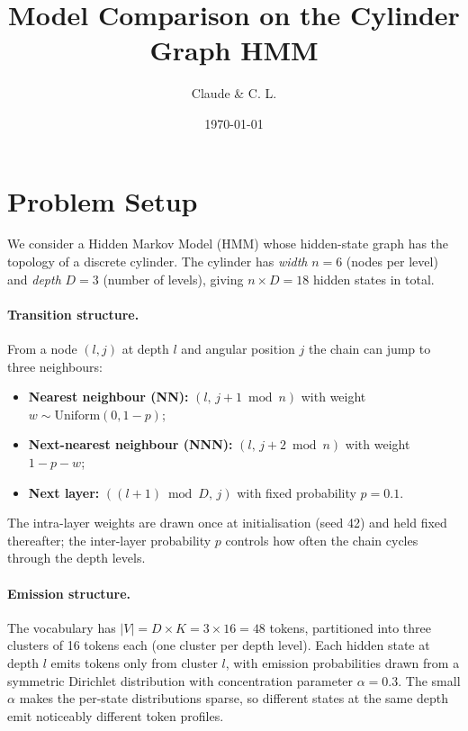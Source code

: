 \documentclass[11pt]{article}
\title{Model Comparison on the Cylinder Graph HMM}
\author{Claude \& C. L.}
\date{\today}
\begin{document}
\maketitle

\section{Problem Setup}

We consider a Hidden Markov Model (HMM) whose hidden-state graph has the
topology of a discrete cylinder.  The cylinder has \emph{width}
$n = 6$ (nodes per level) and \emph{depth} $D = 3$ (number of levels),
giving $n \times D = 18$ hidden states in total.

\paragraph{Transition structure.}
From a node $(l, j)$ at depth $l$ and angular position $j$ the chain can
jump to three neighbours:
\begin{itemize}
  \item \textbf{Nearest neighbour (NN):} $(l,\, j{+}1 \bmod n)$ with
        weight $w \sim \mathrm{Uniform}(0, 1-p)$;
  \item \textbf{Next-nearest neighbour (NNN):} $(l,\, j{+}2 \bmod n)$
        with weight $1 - p - w$;
  \item \textbf{Next layer:} $((l{+}1) \bmod D,\, j)$ with fixed
        probability $p = 0.1$.
\end{itemize}
The intra-layer weights are drawn once at initialisation (seed 42) and
held fixed thereafter; the inter-layer probability $p$ controls how
often the chain cycles through the depth levels.

\paragraph{Emission structure.}
The vocabulary has $|V| = D \times K = 3 \times 16 = 48$ tokens,
partitioned into three clusters of 16 tokens each (one cluster per depth
level).  Each hidden state at depth $l$ emits tokens only from cluster
$l$, with emission probabilities drawn from a symmetric Dirichlet
distribution with concentration parameter $\alpha = 0.3$.  The small
$\alpha$ makes the per-state distributions sparse, so different states
at the same depth emit noticeably different token profiles.
\end{document}
